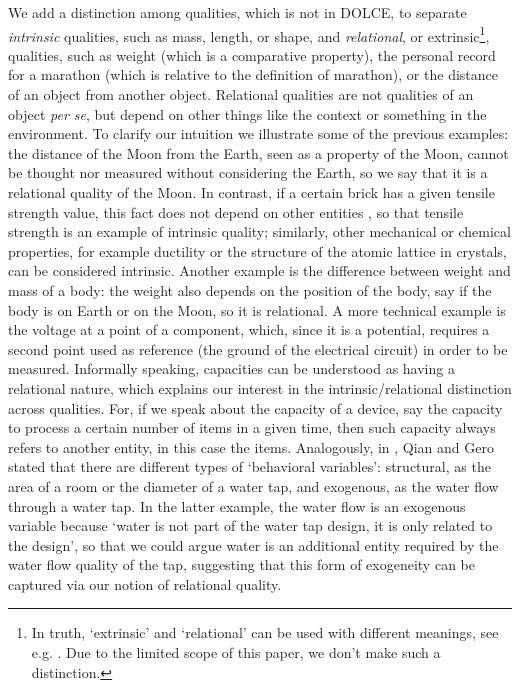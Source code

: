 \documentclass[sw]{iosart2x}
\newcommand{\DOLCE}{\textsc{DOLCE}\xspace} %
\newcommand{\firstTimeKeyWord}[1]{\textit{#1}}
\newcommand{\quotes}[1]{`#1'}
\begin{document}
We add a distinction among qualities, which is not in \DOLCE, to separate \firstTimeKeyWord{intrinsic} qualities, such as mass, length, or shape, and \firstTimeKeyWord{relational}, or extrinsic\footnote{In truth, `extrinsic' and `relational' can be used with different meanings, see e.g. \cite{sep-intrinsic-extrinsic}. Due to the limited scope of this paper, we don't make such a distinction.}, qualities, such as weight (which is a comparative property), the personal record for a marathon (which is relative to the definition of marathon), or the distance of an object from another object. %
Relational qualities are not qualities of an object \textit{per se}, but depend on other things like the context or something in the environment.
To clarify our intuition we illustrate some of the previous examples: the distance of the Moon from the Earth, seen as a property of the Moon, cannot be thought nor measured without considering the Earth, so we say that it is a relational quality of the Moon. In contrast, if a certain brick has a given tensile strength value, %
this fact does not depend on other entities%
, so that tensile strength is an example of intrinsic quality; 
similarly, other mechanical or chemical properties, for example ductility or the structure of the atomic lattice in crystals, can be considered intrinsic. 
Another example is the difference between weight and mass of a body: the weight also depends on the position of the body, say if the body is on Earth or on the Moon, so it is relational. 
A more technical example is the voltage at a point of a component, which, since it is a potential, requires a second point used as  reference (the ground of the electrical circuit) in order to be measured. 
Informally speaking, capacities can be understood as having a relational nature, which explains our interest in the intrinsic/relational distinction across qualities. For, if we speak about the capacity of a device, say the capacity to process a certain number of items in a given time, then such capacity always refers to another entity, in this case the items.  Analogously, in \cite{qianFunctionBehaviorStructure1996}, Qian and Gero stated that there are different types of \quotes{behavioral variables}: structural, as the area of a room or the diameter of a water tap, and exogenous, as the water flow through a water tap. In the latter example, the water flow is an exogenous variable because \quotes{water is not part of the
water tap design, it is only related to the design}, so that we could argue water is an additional entity required by the water flow quality of the tap, suggesting that this form of exogeneity can be captured via our notion of relational quality.  
\end{document}
